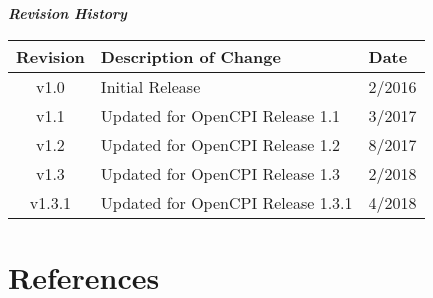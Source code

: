 \maketitle
\thispagestyle{fancy}
\newpage

	\begin{center}
	\textit{\textbf{Revision History}}
		\begin{table}[H] %
		\label{table:revisions}
		\centering
			\begin{tabularx}{.7\textwidth}{|c|X|l|}
			\hline
			\rowcolor{blue}
			\textbf{Revision} & \textbf{Description of Change} & \textbf{Date} \\
		    \hline
			v1.0 & Initial Release & 2/2016 \\
		    \hline
			v1.1 & Updated for OpenCPI Release 1.1 & 3/2017 \\
			\hline
			v1.2 & Updated for OpenCPI Release 1.2 & 8/2017 \\
			\hline
			v1.3 & Updated for OpenCPI Release 1.3 & 2/2018 \\
			\hline
			v1.3.1 & Updated for OpenCPI Release 1.3.1 & 4/2018 \\
			\hline
			\end{tabularx}
		\end{table}
	\end{center}

\newpage

\tableofcontents

\newpage


\listoftables

\newpage

\section{References}

